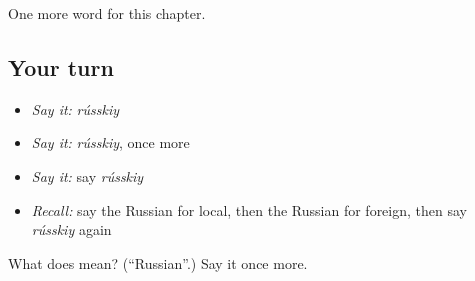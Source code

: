 \begin{grammarlens}[title={What you've built}]
One more word for this chapter.
\end{grammarlens}

\subsection*{Your turn}
\begin{itemize}
\raggedright
  \item \emph{Say it:} \emph{rússkiy}
  \item \emph{Say it:} \emph{rússkiy}, once more
  \item \emph{Say it:} say \emph{rússkiy}
  \item \emph{Recall:} say the Russian for local, then the Russian for foreign, then say \emph{rússkiy} again
\end{itemize}

\begin{tcolorbox}[breakable,colback=teal!4,colframe=teal!35!black,title={Before you move on}]
What does  mean? (\textquotedblleft{}Russian\textquotedblright{}.) Say it once more.
\end{tcolorbox}
